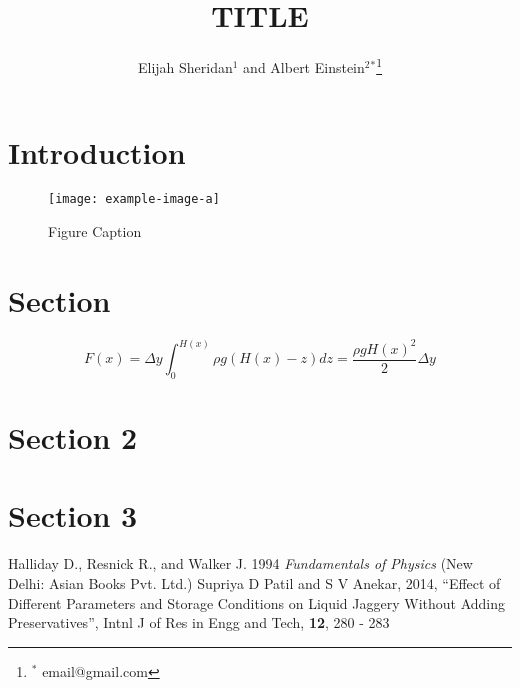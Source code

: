 \documentclass[jr]{sjp}
\begin{document}

\title{TITLE}
\author[]{Elijah Sheridan$^1$ and Albert Einstein$^2$$^\ast$\footnote{$^\ast$ email@gmail.com}} %
\address[]{$^1$Institution 1  \\
$^2$Institution 2,\\ Second line \\} 

\begin{abstract}
\lipsum[10]
\end{abstract}

\maketitle


\section{Introduction}
\lipsum[1]

\begin{figure}[h]
 \begin{center}
 \texttt{[image: example-image-a]}
\caption{Figure Caption}
\end{center}
\end{figure}

\section{Section}
\noindent \lipsum[2]
\lipsum[3]

\begin{equation}
F(x)  = \Delta  y  \int_0^{H(x)}\rho g(H(x)  - z)  dz  = \frac{\rho  gH(x)^2}{2} \Delta y
\end{equation}


\section{Section 2}
\lipsum[4]

\section{Section 3}
\lipsum[5]


\begin{thebibliography}{99}
 Halliday D., Resnick R., and Walker J. 1994 \textit{
Fundamentals of Physics}  (New Delhi: Asian Books Pvt. Ltd.) 
 Supriya D Patil and S V Anekar, 2014, ``Effect of 
Different Parameters and Storage Conditions on Liquid Jaggery Without 
Adding Preservatives'', Intnl J of Res in Engg and Tech, \textbf{12}, 
280 - 283
\end{thebibliography}
\end{document}
